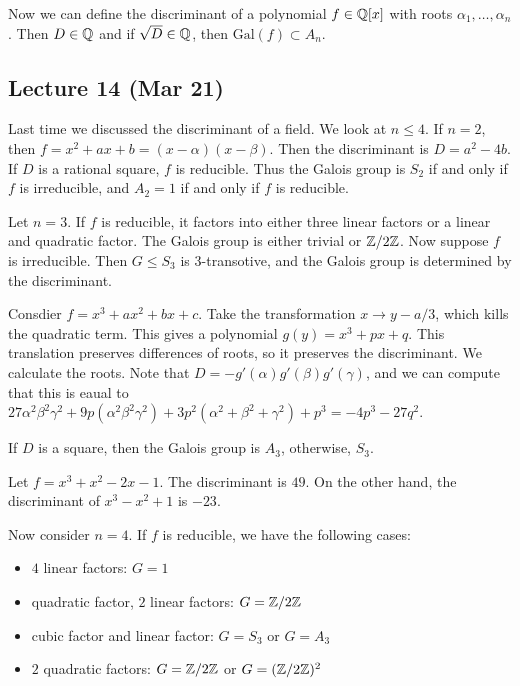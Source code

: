 \documentclass[10pt, twoside]{article}
\begin{document}
        Now we can define the discriminant of a polynomial $f \in \mathbb{Q}[x]$ with
        roots $\alpha_1, \ldots, \alpha_n$. Then $D \in \mathbb{Q}$ and if $\sqrt{D}
        \in \mathbb{Q}$, then $\mathrm{Gal}(f) \subset A_n$.

        \subsection{Lecture 14 (Mar 21)}

        Last time we discussed the discriminant of a field. We look at $n \leq
        4$. If $n = 2$, then $f = x^2 + ax + b = (x-\alpha)(x - \beta)$. Then
        the discriminant is $D = a^2 - 4b$. If $D$ is a rational square, $f$ is
        reducible. Thus the Galois group is $S_2$ if and only if $f$ is
        irreducible, and $A_2 = 1$ if and only if $f$ is reducible.

        Let $n=3$. If $f$ is reducible, it factors into either three linear
        factors or a linear and quadratic factor. The Galois group is either
        trivial or $\mathbb{Z}/2\mathbb{Z}$. Now suppose $f$ is irreducible. Then $G \leq S_3$
        is $3$-transotive, and the Galois group is determined by the
        discriminant. 

        Consdier $f = x^3 + ax^2 + bx + c$. Take the transformation $x \to
        y-a/3$, which kills the quadratic term. This gives a polynomial $g(y) =
        x^3 + px + q$. This translation preserves differences of roots, so it
        preserves the discriminant. We calculate the roots. Note that $D =
        -g'(\alpha)g'(\beta)g'(\gamma)$, and we can compute that this is eaual
        to $27 \alpha^2 \beta^2 \gamma^2 + 9p(\alpha^2 \beta^2 \gamma^2) + 3p^2
        (\alpha^2 + \beta^2 + \gamma^2) + p^3 = -4p^3 - 27q^2$.

        If $D$ is a square, then the Galois group is $A_3$, otherwise, $S_3$.

        \begin{exm} Let $f = x^3+x^2-2x-1$. The discriminant is $49$. On the
        other hand, the discriminant of $x^3-x^2 + 1$ is $-23$.  \end{exm}

        Now consider $n = 4$. If $f$ is reducible, we have the following cases:
        \begin{itemize} \item $4$ linear factors: $G = 1$ \item quadratic
            factor, $2$ linear factors: $G = \mathbb{Z}/2\mathbb{Z}$ \item cubic factor and
            linear factor: $G = S_3$ or $G = A_3$ \item $2$ quadratic factors:
    $G = \mathbb{Z}/2\mathbb{Z}$ or $G = (\mathbb{Z}/2\mathbb{Z})^2$ \end{itemize}
\end{document}
